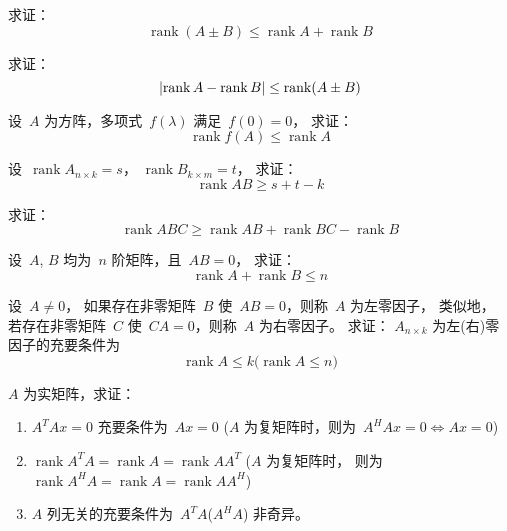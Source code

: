 \documentclass[twoside,openright]{book}
\begin{document}
\begin{CJK*}{UTF8}{}
\begin{quest}
\label{quest:139}
求证：
\[
\operatorname{rank} ( A \pm B ) \leq \operatorname{rank} A + \operatorname{rank} B
\]
\end{quest}

\begin{quest}
\label{quest:140}
求证：
\[
\lvert{\operatorname{rank} A - \operatorname{rank} B}\rvert
\leq
\operatorname{rank} ( A \pm B )
\]
\end{quest}

\begin{quest}
\label{quest:141}
设\ $A$ 为方阵，多项式\ $f(\lambda)$ 满足\ $f(0)=0$，
求证：
\[
\operatorname{rank} f(A)
\leq
\operatorname{rank} A
\]
\end{quest}

\begin{quest}
\label{quest:142}
设\ $\operatorname{rank} A_{n \times k}=s$，
$\operatorname{rank} B_{k \times m}=t$，
求证：
\[
\operatorname{rank} A B
\geq
s + t - k
\]
\end{quest}

\begin{quest}
\label{quest:143}
求证：
\[
\operatorname{rank} A B C
\geq
\operatorname{rank} A B +
\operatorname{rank} B C -
\operatorname{rank} B
\]
\end{quest}

\begin{quest}
\label{quest:144}
设\ $A$, $B$ 均为\ $n$ 阶矩阵，且\ $AB=0$，
求证：
\[
\operatorname{rank} A +
\operatorname{rank} B
\leq n
\]
\end{quest}

\begin{quest}
\label{quest:145}
设\ $A\neq 0$，
如果存在非零矩阵\ $B$ 使\ $AB=0$，则称\ $A$ 为左零因子，
类似地，
若存在非零矩阵\ $C$ 使\ $CA=0$，则称\ $A$ 为右零因子。
求证：
$A_{n \times k}$ 为左(右)零因子的充要条件为
\[
\operatorname{rank} A \leq k
\text{(}
\operatorname{rank} A \leq n
\text{)}
\]
\end{quest}

\begin{quest}
\label{quest:146}
$A$ 为实矩阵，求证：
\begin{enumerate}
\item
$A^T A x = 0$ 充要条件为\ $Ax=0$ ($A$ 为复矩阵时，则为\ $A^H A x = 0 \Longleftrightarrow Ax=0$)
\item
$\operatorname{rank}A^TA=\operatorname{rank}A=\operatorname{rank}AA^T$
($A$ 为复矩阵时，
则为\ $\operatorname{rank}A^HA=\operatorname{rank}A=\operatorname{rank}AA^H$)
\item
$A$ 列无关的充要条件为\ $A^T A$($A^H A$) 非奇异。
\end{enumerate}
\end{quest}


\end{CJK*}
\end{document}
